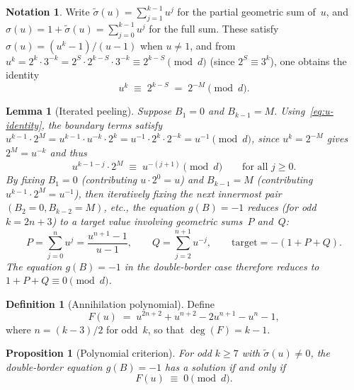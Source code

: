 \documentclass[12pt, a4paper]{amsart}
\theoremstyle{plain}
\newtheorem{proposition}[theorem]{Proposition}
\newtheorem{lemma}[theorem]{Lemma}
\theoremstyle{definition}
\newtheorem{definition}[theorem]{Definition}
\newtheorem{notation}[theorem]{Notation}
\theoremstyle{remark}
\begin{document}
\begin{notation}\label{not:partial-sums}
  Write $\tilde\sigma(u) = \sum_{j=1}^{k-1} u^j$ for the
  partial geometric sum of~$u$, and
  $\sigma(u) = 1 + \tilde\sigma(u) = \sum_{j=0}^{k-1} u^j$
  for the full sum.
  These satisfy $\sigma(u) = (u^k - 1)/(u - 1)$ when
  $u \neq 1$, and from $u^k = 2^k \cdot 3^{-k}
  = 2^{S} \cdot 2^{k-S} \cdot 3^{-k}
  \equiv 2^{k-S} \pmod{d}$ (since $2^S \equiv 3^k$), one
  obtains the identity
  \begin{equation}\label{eq:u-identity}
    u^k \;\equiv\; 2^{k-S} \;=\; 2^{-M} \pmod{d}.
  \end{equation}
\end{notation}

\begin{lemma}[Iterated peeling]\label{lem:iterated-peeling}
  Suppose $B_1 = 0$ and $B_{k-1} = M$.
  Using~\eqref{eq:u-identity}, the boundary terms satisfy
  $u^{k-1} \cdot 2^M = u^{k-1} \cdot u^{-k} \cdot 2^k
  = u^{-1} \cdot 2^k \cdot 2^{-k} = u^{-1} \pmod{d}$,
  since $u^k = 2^{-M}$ gives $2^M = u^{-k}$ and thus
  \[
    u^{k-1-j} \cdot 2^M
    \;\equiv\; u^{-(j+1)} \pmod{d}
    \qquad\text{for all } j \geq 0.
  \]
  By fixing $B_1 = 0$ (contributing $u \cdot 2^0 = u$) and
  $B_{k-1} = M$ (contributing $u^{k-1} \cdot 2^M = u^{-1}$),
  then iteratively fixing the next innermost pair
  $(B_2 = 0, B_{k-2} = M)$, etc., the equation $g(B) = -1$
  reduces (for odd~$k = 2n + 3$) to a target value
  involving geometric sums~$P$ and~$Q$:
  \[
    P = \sum_{j=0}^{n} u^j
    = \frac{u^{n+1} - 1}{u - 1},
    \qquad
    Q = \sum_{j=2}^{n+1} u^{-j},
    \qquad
    \text{target} = -(1 + P + Q).
  \]
  The equation $g(B) = -1$ in the double-border case therefore
  reduces to $1 + P + Q \equiv 0 \pmod{d}$.
\end{lemma}

\begin{definition}[Annihilation polynomial]\label{def:F-poly}
  Define
  \begin{equation}\label{eq:F-poly}
    F(u) \;=\; u^{2n+2} + u^{n+2} - 2u^{n+1} - u^n - 1,
  \end{equation}
  where $n = (k-3)/2$ for odd~$k$, so that $\deg(F) = k - 1$.
\end{definition}

\begin{proposition}[Polynomial criterion]\label{prop:F-criterion}
  For odd $k \geq 7$ with $\tilde\sigma(u) \neq 0$, the
  double-border equation $g(B) = -1$ has a solution
  if and only if
  \begin{equation}\label{eq:F-vanishes}
    F(u) \;\equiv\; 0 \pmod{d}.
  \end{equation}
\end{proposition}
\end{document}
